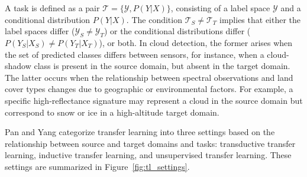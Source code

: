 A task is defined as a pair $\mathcal{T} = \{\mathcal{Y}, P(Y|X)\}$, consisting of a label space $\mathcal{Y}$ and a conditional distribution $P(Y|X)$. The condition $\mathcal{T}_S \neq \mathcal{T}_T$ implies that either the label spaces differ ($\mathcal{Y}_S \neq \mathcal{Y}_T$) or the conditional distributions differ ($P(Y_S|X_S)\neq P(Y_T|X_T)$), or both. In cloud detection, the former arises when the set of predicted classes differs between sensors, for instance, when a cloud-shadow class is present in the source domain, but absent in the target domain. The latter occurs when the relationship between spectral observations and land cover types changes due to geographic or environmental factors. For example, a specific high-reflectance signature may represent a cloud in the source domain but correspond to snow or ice in a high-altitude target domain.

Pan and Yang \cite{pan2010} categorize transfer learning into three settings based on the relationship between source and target domains and tasks: transductive transfer learning, inductive transfer learning, and unsupervised transfer learning. These settings are summarized in Figure~\ref{fig:tl_settings}.

